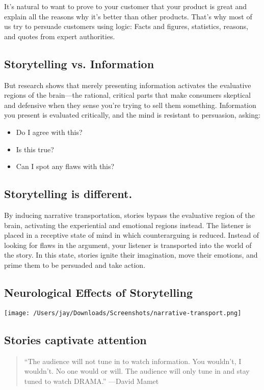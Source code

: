 \documentclass[12pt]{article}
\begin{document}
It's natural to want to prove to your customer that your product is great and explain all the reasons why it's better than other products. That's why most of us try to persuade customers using logic: Facts and figures, statistics, reasons, and quotes from expert authorities.

\subsection{Storytelling vs. Information}
\label{sec:orga8c85b5}

But research shows that merely presenting information activates the evaluative regions of the brain---the rational, critical parts that make consumers skeptical and defensive when they sense you're trying to sell them something. Information you present is evaluated critically, and the mind is resistant to persuasion, asking:
\begin{itemize}
\item Do I agree with this?
\item Is this true?
\item Can I spot any flaws with this?
\end{itemize}

\subsection{Storytelling is different.}
\label{sec:org029952e}
By inducing narrative transportation, stories bypass the evaluative region of the brain, activating the experiential and emotional regions instead. The listener is placed in a receptive state of mind in which counterarguing is reduced. Instead of looking for flaws in the argument, your listener is transported into the world of the story. In this state, stories ignite their imagination, move their emotions, and prime them to be persuaded and take action.

\subsection{Neurological Effects of Storytelling}
\label{sec:orga1c5100}

\begin{center}
\texttt{[image: /Users/jay/Downloads/Screenshots/narrative-transport.png]}
\end{center}


\subsection{Stories captivate attention}
\label{sec:orgf5a5a0e}
\begin{quote}
``The audience will not tune in to watch information. You wouldn't, I wouldn't. No one would or will. The audience will only tune in and stay tuned to watch DRAMA.''
---David Mamet
\end{quote}
\end{document}
